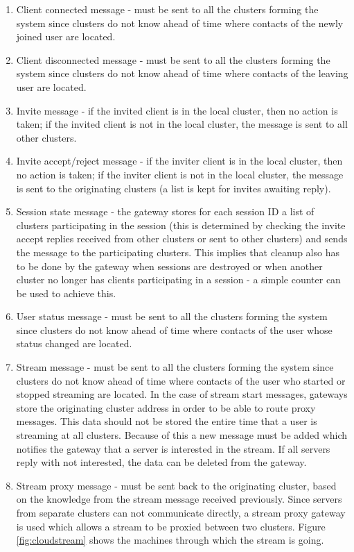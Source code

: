 \begin{enumerate}
	\item Client connected message - must be sent to all the clusters forming the system since clusters do not know ahead of time where contacts of the newly joined user are located.
	\item Client disconnected message - must be sent to all the clusters forming the system since clusters do not know ahead of time where contacts of the leaving user are located.
	\item Invite message - if the invited client is in the local cluster, then no action is taken; if the invited client is not in the local cluster, the message is sent to all other clusters.
	\item Invite accept/reject message - if the inviter client is in the local cluster, then no action is taken; if the inviter client is not in the local cluster, the message is sent to the originating clusters (a list is kept for invites awaiting reply).
	\item Session state message - the gateway stores for each session ID a list of clusters participating in the session (this is determined by checking the invite accept replies received from other clusters or sent to other clusters) and sends the message to the participating clusters. This implies that cleanup also has to be done by the gateway when sessions are destroyed or when another cluster no longer has clients participating in a session - a simple counter can be used to achieve this.
	\item User status message - must be sent to all the clusters forming the system since clusters do not know ahead of time where contacts of the user whose status changed are located.
	\item Stream message - must be sent to all the clusters forming the system since clusters do not know ahead of time where contacts of the user who started or stopped streaming are located. In the case of stream start messages, gateways store the originating cluster address in order to be able to route proxy messages. This data should not be stored the entire time that a user is streaming at all clusters. Because of this a new message must be added which notifies the gateway that a server is interested in the stream. If all servers reply with not interested, the data can be deleted from the gateway.
	\item Stream proxy message - must be sent back to the originating cluster, based on the knowledge from the stream message received previously. Since servers from separate clusters can not communicate directly, a stream proxy gateway is used which allows a stream to be proxied between two clusters. Figure \ref{fig:cloudstream} shows the machines through which the stream is going.
\end{enumerate}

